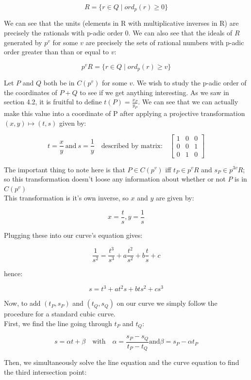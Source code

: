 \documentclass{article}
\begin{document}
\[ R = \{r \in Q \; | \; ord_p(r) \geq 0\} \]

We can see that the units (elements in R with multiplicative inverses in R) are precisely the rationals with p-adic order 0. We can also see that the ideals of $R$ generated by $p^v$ for some $v$ are precisely the sets of rational numbers with p-adic order greater than than or equal to $v$:

\[ p^vR = \{r \in Q \; | \; ord_p(r) \geq v\} \]

Let $P$ and $Q$ both be in $C(p^v)$ for some $v$. We wish to study the p-adic order of the coordinates of $P + Q$ to see if we get anything interesting. As we saw in section 4.2, it is fruitful to define $t(P) = \frac{x_P}{y_P}$. We can see that we can actually make this value into a coordinate of P after applying a projective transformation $(x, y) \mapsto (t, s)$ given by:

\[ t = \frac{x}{y} \ \text{and} \ s = \frac{1}{y} 
\quad \text{described by matrix:} \quad \begin{bmatrix}
    1 & 0 & 0\\
    0 & 0 & 1\\
    0 & 1 & 0
\end{bmatrix}
\]

The important thing to note here is that $P \in C(p^v)$ iff $t_P \in p^v R$ and $s_P \in p^{3v} R$; so this transformation doesn't loose any information about whether or not $P$ is in $C(p^v)$\\

This transformation is it's own inverse, so $x$ and $y$ are given by:

\[ x = \frac{t}{s}, y = \frac{1}{s} \]

Plugging these into our curve's equation gives:

\[ \frac{1}{s^2} = \frac{t^3}{s^3} + a \frac{t^2}{s^2} + b \frac{t}{s} + c \]

hence:

\[ s = t^3 + a t^2 s + b t s^2 + c s^3 \]

Now, to add $(t_P, s_P)$ and $(t_Q, s_Q)$ on our curve we simply follow the procedure for a standard cubic curve.\\

First, we find the line going through $t_P$ and $t_Q$:

\[ s = \alpha t + \beta \quad \text{with} \quad \alpha = \frac{s_P - s_Q}{t_P - t_Q} \text{and} \beta = s_P - \alpha t_P \]

Then, we simultaneously solve the line equation and the curve equation to find the third intersection point:
\end{document}
